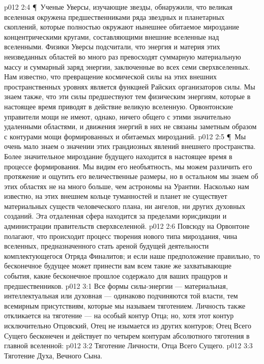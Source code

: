 \vs p012 2:4 \P\ Ученые Уверсы, изучающие звезды, обнаружили, что великая вселенная окружена предшественниками ряда звездных и планетарных скоплений, которые полностью окружают нынешнее обитаемое мироздание концентрическими кругами, составляющими внешние вселенные над вселенными. Физики Уверсы подсчитали, что энергия и материя этих неизведанных областей во много раз превосходят суммарную материальную массу и суммарный заряд энергии, заключенные во всех семи сверхвселенных. Нам известно, что превращение космической силы на этих внешних пространственных уровнях является функцией Райских организаторов силы. Мы знаем также, что эти силы предшествуют тем физическим энергиям, которые в настоящее время приводят в действие великую вселенную. Орвонтонские управители мощи не имеют, однако, ничего общего с этими значительно удаленными областями, и движения энергий в них не связаны заметным образом с контурами мощи формированных и обитаемых мирозданий.
\vs p012 2:5 \P\ Мы очень мало знаем о значении этих грандиозных явлений внешнего пространства. Более значительное мироздание будущего находится в настоящее время в процессе формирования. Мы видим его необъятность, мы можем различить его протяжение и ощутить его величественные размеры, но в остальном мы знаем об этих областях не на много больше, чем астрономы на Урантии. Насколько нам известно, на этих внешнем кольце туманностей и планет не существует материальных существ человеческого плана, ни ангелов, ни других духовных созданий. Эта отдаленная сфера находится за пределами юрисдикции и администрации правительств сверхвселенной.
\vs p012 2:6 Повсюду на Орвонтоне полагают, что происходит процесс творения нового типа мироздания, чина вселенных, предназначенного стать ареной будущей деятельности комплектующегося Отряда Финалитов; и если наше предположение правильно, то бесконечное будущее может принести вам всем такие же захватывающие события, какие бесконечное прошлое содержало для ваших пращуров и предшественников.
\vs p012 3:1 Все формы силы\hyp{}энергии --- материальная, интеллектуальная или духовная --- одинаково подчиняются той власти, тем всемирным присутствиям, которые мы называем тяготением. Личность также откликается на тяготение --- на особый контур Отца; но, хотя этот контур исключительно Отцовский, Отец не изымается из других контуров; Отец Всего Сущего бесконечен и действует по  четырем контурам абсолютного тяготения в главной вселенной:
\vs p012 3:2 \bibnobreakspace Тяготение Личности, Отца Всего Сущего.
\vs p012 3:3 \bibnobreakspace Тяготение Духа, Вечного Сына.
